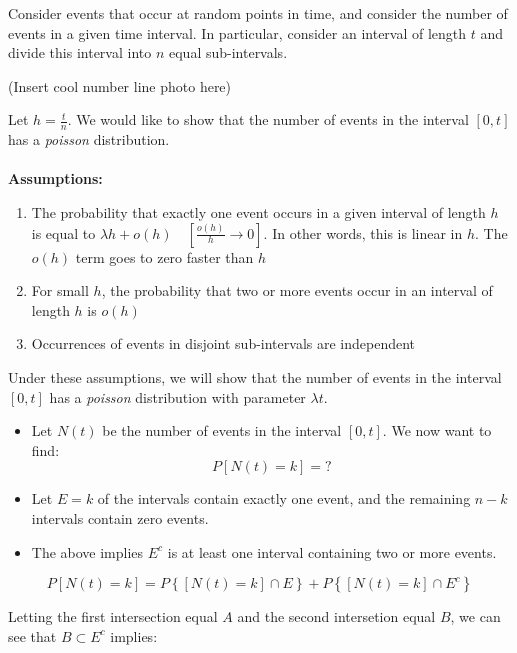 \documentclass{article}
\begin{document}
Consider events that occur at random points in time, and consider the number of events in a given time interval. In particular, consider an interval of length $t$ and divide this interval into $n$ equal sub-intervals.

(Insert cool number line photo here)

Let $h = \frac{t}{n}$. We would like to show that the number of events in the interval $[0,t]$ has a \textit{poisson} distribution.
\\~\\
\noindent \textbf{Assumptions:}
\begin{enumerate}
    \item The probability that exactly one event occurs in a given interval of length $h$ is equal to $\lambda h + o(h)\quad \left[\frac{o(h)}{h} \to 0 \right]$. In other words, this is linear in $h$. The $o(h)$ term goes to zero faster than $h$
    \item For small $h$, the probability that two or more events occur in an interval of length $h$ is $o(h)$
    \item Occurrences of events in disjoint sub-intervals are independent
\end{enumerate}

\noindent Under these assumptions, we will show that the number of events in the interval $[0,t]$ has a \textit{poisson} distribution with parameter $\lambda t$.

\begin{itemize}
    \item Let $N(t)$ be the number of events in the interval $[0,t]$. We now want to find:
\begin{equation*}
    P\left[ N(t) = k \right] = ?
\end{equation*}

\item Let $E=k$ of the intervals contain exactly one event, and the remaining $n-k$ intervals contain zero events.

\item The above implies $E^c$ is at least one interval containing two or more events.
\end{itemize}

\begin{equation*}
    P\left[ N(t) = k \right] = P\left\{ \left[ N(t) = k \right] \cap E \right\} + P\left\{ \left[ N(t) = k \right] \cap E^c\right\}
\end{equation*}

Letting the first intersection equal $A$ and the second intersetion equal $B$, we can see that $B \subset E^c$ implies: 
\end{document}
